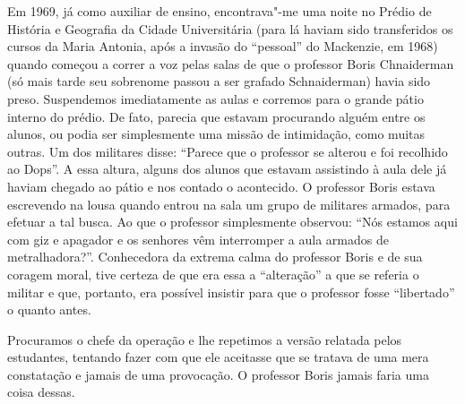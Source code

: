 Em 1969, já como auxiliar de ensino, encontrava"-me uma noite no Prédio
de História e Geografia da Cidade Universitária (para lá haviam sido
transferidos os cursos da Maria Antonia, após a invasão do ``pessoal''
do Mackenzie, em 1968) quando começou a correr a voz pelas salas de que
o professor Boris Chnaiderman (só mais tarde seu sobrenome passou a ser
grafado Schnaiderman) havia sido preso. Suspendemos imediatamente as
aulas e corremos para o grande pátio interno do prédio. De fato, parecia
que estavam procurando alguém entre os alunos, ou podia ser simplesmente
uma missão de intimidação, como muitas outras. Um dos militares disse:
``Parece que o professor se alterou e foi recolhido ao Dops''. A essa
altura, alguns dos alunos que estavam assistindo à aula dele já haviam
chegado ao pátio e nos contado o acontecido. O professor Boris estava
escrevendo na lousa quando entrou na sala um grupo de militares armados,
para efetuar a tal busca. Ao que o professor simplesmente observou:
``Nós estamos aqui com giz e apagador e os senhores vêm interromper a
aula armados de metralhadora?''. Conhecedora da extrema calma do
professor Boris e de sua coragem moral, tive certeza de que era essa a
``alteração'' a que se referia o militar e que, portanto, era possível
insistir para que o professor fosse ``libertado'' o quanto antes.

Procuramos o chefe da operação e lhe repetimos a versão relatada pelos
estudantes, tentando fazer com que ele aceitasse que se tratava de uma
mera constatação e jamais de uma provocação. O professor Boris jamais
faria uma coisa dessas.

